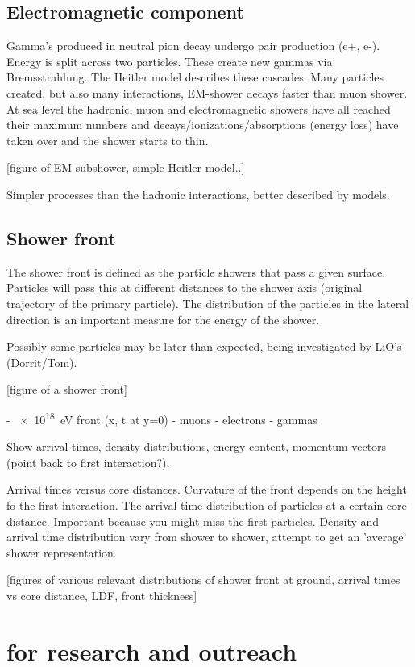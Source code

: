 \subsection{Electromagnetic component}

Gamma's produced in neutral pion decay undergo pair production (e+, e-). Energy is split across two particles. These create new gammas via Bremsstrahlung.
The Heitler model describes these cascades.
Many particles created, but also many interactions, EM-shower decays faster than muon shower. At sea level the hadronic, muon and electromagnetic showers have all reached their maximum numbers and decays/ionizations/absorptions (energy loss) have taken over and the shower starts to thin.

[figure of EM subshower, simple Heitler model..]

Simpler processes than the hadronic interactions, better described by models.


\subsection{Shower front}

The shower front is defined as the particle showers that pass a given surface. Particles will pass this at different distances to the shower axis (original trajectory of the primary particle). The distribution of the particles in the lateral direction is an important measure for the energy of the shower.

Possibly some particles may be later than expected, being investigated by LiO's (Dorrit/Tom).

[figure of a shower front]

- \SI{e18}{\electronvolt} front (x, t at y=0)
    - muons
    - electrons
    - gammas

Show arrival times, density distributions, energy content, momentum vectors (point back to first interaction?).

Arrival times versus core distances. Curvature of the front depends on the height fo the first interaction. The arrival time distribution of particles at a certain core distance. Important because you might miss the first particles. Density and arrival time distribution vary from shower to shower, attempt to get an 'average' shower representation.

[figures of various relevant distributions of shower front at ground, arrival times vs core distance, LDF, front thickness]


\section{\hisparc for research and outreach}

